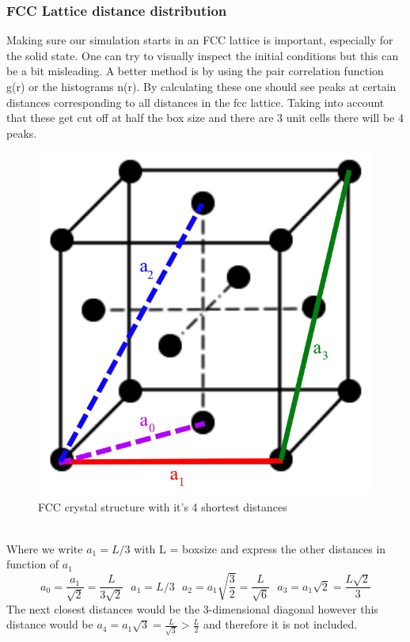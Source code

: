\documentclass[a4paper,12pt]{article} %
\begin{document}
\subsubsection{FCC Lattice distance distribution}\label{Lattice}
Making sure our simulation starts in an FCC lattice is important, especially for the solid state. One can try to visually inspect the initial conditions but this can be a bit misleading. A better method is by using the pair correlation function g(r) or the histograms n(r). By calculating these one should see peaks at certain distances corresponding to all distances in the fcc lattice. Taking into account that these get cut off at half the box size and there are 3 unit cells there will be 4 peaks.
\begin{figure}[!h]
    \centering
    \includegraphics[width=0.4\linewidth]{Images/Lattice.jpg}
    \caption{FCC crystal structure with it's 4 shortest distances}
    \label{fig:Lattice}
\end{figure}\\
Where we write $a_1 = L/3$ with L = boxsize and express the other distances in function of $a_1$
\begin{equation}
    a_0 = \frac{a_1}{\sqrt{2}} = \frac{L}{3\sqrt{2}} \ \ \
    a_1  = L/3 \ \ \
    a_2 = a_1\sqrt{\frac{3}{2}} = \frac{L}{\sqrt{6}} \ \ \ a_3 = a_1\sqrt{2} = \frac{L\sqrt{2}}{3}
\end{equation}
The next closest distances would be the 3-dimensional diagonal however this distance would be $a_4 = a_1\sqrt{3} = \frac{L}{\sqrt{3}} > \frac{L}{2}$ and therefore it is not included.
\end{document}
